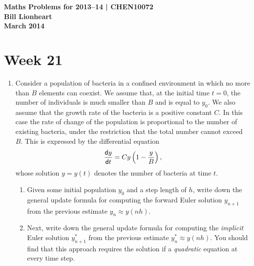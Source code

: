 \documentclass[11pt,a4paper]{article}
\newcommand{\dif}{\mathsf{d}}
\begin{document}
\begin{center} 
{\bf Maths Problems for 2013--14 | CHEN10072 \\
Bill Lionheart\\
 March 2014}
\end{center}

\section*{Week 21}

 \begin{enumerate}
\item \label{qdjsode2}
 Consider a population of bacteria in a confined environment in which no more than 
 $B$ elements can coexist. We assume that, at the initial time $t=0$, the number of individuals
 is  much smaller than $B$ and is equal to $y_0$. We also assume that
 the growth rate of the bacteria is a positive constant  $C$.
 In this case the rate of change of the population is proportional to the number
 of existing bacteria, under the restriction that the total number cannot exceed
 $B$. This is expressed by the differential equation 
 $${\dif y\over \dif t} = Cy \left( 1-{y\over B}\right),$$
 whose solution $y=y(t)$ denotes the number of bacteria at time $t$.
 
 \begin{enumerate}
\item 
Given some initial population $y_0$ and a  step length of $h$,
write down the general update formula for computing the forward Euler 
solution  $y_{n+1}$  from the previous estimate $y_n\approx y(nh)$.
\item 
Next, write down the general update formula for computing the {\it implicit} Euler 
solution  $y^*_{n+1}$  from the previous estimate $y^*_n \approx y(nh)$.
You should find that this approach requires the solution if a 
{\it quadratic} equation at every time step.  \end{enumerate}


\end{enumerate}
\end{document}
